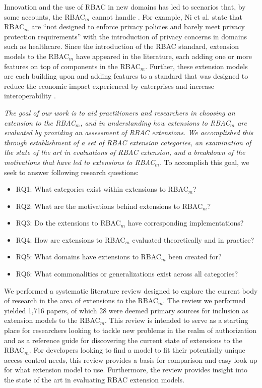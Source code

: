 Innovation and the use of RBAC in new domains has led to scenarios that, by some accounts, the RBAC$_{m}$ cannot handle \cite{kuhn2010adding}.  
For example, Ni et al. \cite{ni2010privacy} state that RBAC$_{m}$ are ``not designed to enforce privacy policies and barely 
meet privacy protection requirements'' with the introduction of privacy concerns in domains such as healthcare. 
Since the introduction of the RBAC standard, extension models to the RBAC$_{m}$ have appeared in the literature, each adding one or more features on top of components in the RBAC$_{m}$.
Further, these extension models are each building upon and adding features to a standard that was designed to reduce the economic impact experienced by enterprises and increase interoperability \cite{o20102010}.

\textit{The goal of our work is to aid practitioners and researchers in choosing an extension to the RBAC$_{m}$, and in understanding
how extensions to RBAC$_{m}$ are evaluated by providing an assessment of RBAC extensions. We accomplished this through 
establishment of a set of RBAC extension categories, an examination of the state of the art in evaluations of RBAC extension, and a breakdown of the 
motivations that have led to extensions to RBAC$_{m}$.} To accomplish this goal, we seek to answer following research questions:

\begin{itemize}
\setlength{\itemsep}{0.25pt}
\item RQ1: What categories exist within extensions to RBAC$_{m}$?
\item RQ2: What are the motivations behind extensions to RBAC$_{m}$?
\item RQ3: Do the extensions to RBAC$_{m}$ have corresponding implementations?
\item RQ4: How are extensions to RBAC$_{m}$ evaluated theoretically and in practice?
\item RQ5: What domains have extensions to RBAC$_{m}$ been created for?
\item RQ6: What commonalities or generalizations exist across all categories?
\end{itemize}

We performed a systematic literature review designed to explore the current body of research in the area of extensions to the RBAC$_{m}$. 
The review we performed yielded 1,716 papers, of which 28 were deemed primary sources for inclusion as extension models to the RBAC$_{m}$.  
This review is intended to serve as a starting place for researchers looking to tackle new problems in the realm of authorization and as a reference guide for discovering
the current state of extensions to the RBAC$_{m}$. 
For developers looking to find a model to fit their potentially unique access control needs, this review provides a basis for comparison and easy look up for what extension model to use.  
Furthermore, the review provides insight into the state of the art in evaluating RBAC extension models.

